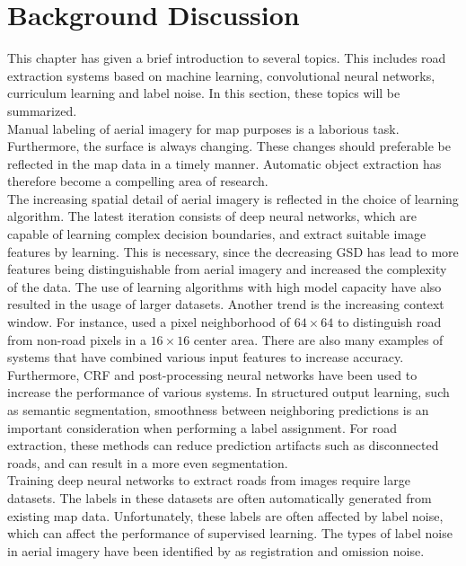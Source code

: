 \section{Background Discussion}
\label{sec:backgroundDiscussion}
This chapter has given a brief introduction to several topics. This includes road extraction systems based on machine learning, convolutional neural networks, curriculum learning and label noise. In this section, these topics will be summarized. \\

Manual labeling of aerial imagery for map purposes is a laborious task. Furthermore, the surface is always changing. These changes should preferable be reflected in the map data in a timely manner. Automatic object extraction has therefore become a compelling area of research.\\

The increasing spatial detail of aerial imagery is reflected in the choice of learning algorithm. The latest iteration consists of deep neural networks, which are capable of learning complex decision boundaries, and extract suitable image features by learning. This is necessary, since the decreasing \ac{GSD} has lead to more features being distinguishable from aerial imagery and increased the complexity of the data. The use of learning algorithms with high model capacity have also resulted in the usage of larger datasets. Another trend is the increasing context window. For instance, \cite{Mnih_roads_high_res_aerial_images} used a pixel neighborhood of $64 \times 64$ to distinguish road from non-road pixels in a $16 \times 16$ center area. There are also many examples of systems that have combined various input features to increase accuracy.\\

Furthermore, \ac{CRF} and post-processing neural networks have been used to increase the performance of various systems. In structured output learning, such as semantic segmentation, smoothness between neighboring predictions is an important consideration when performing a label assignment. For road extraction, these methods can reduce prediction artifacts such as disconnected roads, and can result in a more even segmentation.\\

Training deep neural networks to extract roads from images require large datasets. The labels in these datasets are often automatically generated from existing map data. Unfortunately, these labels are often affected by label noise, which can affect the performance of supervised learning. The types of label noise in aerial imagery have been identified by \cite{Mnih_aerial_images_noisy} as registration and omission noise.  \\

